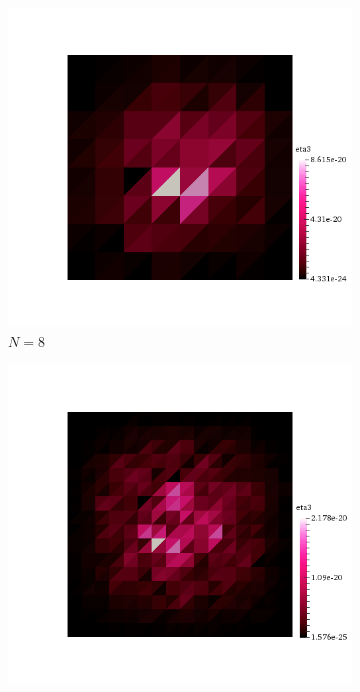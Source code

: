 \mbox{}\\ \\
\begin{figure}[h!]
  \centering
  \begin{subfigure}[b]{0.24\textwidth}
    \includegraphics[width=\textwidth,height=\textheight,keepaspectratio,height=\textheight,keepaspectratio]{figures/2_mpet/biomedical/space/eta3_8.png}
    \caption{$N=8$}
  \end{subfigure}
  \begin{subfigure}[b]{0.24\textwidth}
    \includegraphics[width=\textwidth,height=\textheight,keepaspectratio,height=\textheight,keepaspectratio]{figures/2_mpet/biomedical/space/eta3_16.png}

\end{subfigure}
\end{figure}

